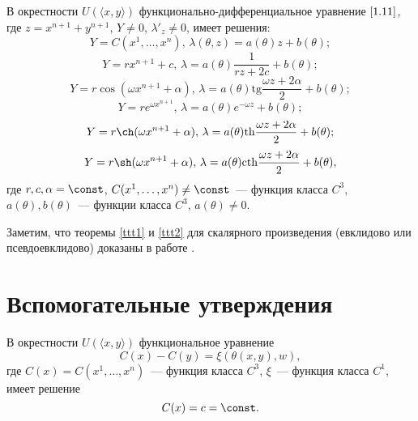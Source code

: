 \begin{thm}\label{ttt2} В окрестности $U(\langle x,y\rangle)$ функционально-дифференциальное уравнение $\eqref{1.11}$, где $z = x^{n+1} + y^{n+1}$, $Y\ne0$, $\lambda'_z\ne0$, имеет решения:
\begin{equation}\label{1.19} Y = C(x^1,\ldots,x^n),\,\lambda(\theta,z) = a(\theta)z + b(\theta); \end{equation}
\begin{equation}\label{1.20} Y = rx^{n+1} + c,\,\lambda = a(\theta)\dfrac{1}{rz+2c} + b(\theta); \end{equation}
\begin{equation}\label{1.21} Y =r\cos(\omega x^{n+1} + \alpha),\,\lambda = a(\theta)\text{tg}\dfrac{\omega z+2\alpha}{2} + b(\theta); \end{equation}
\begin{equation}\label{1.22} Y =re^{\omega x^{n+1}},\,\lambda = a(\theta)e^{-\omega z} + b(\theta); \end{equation}
\begin{equation}\label{1.23} Y =r\ch(\omega x^{n+1} + \alpha),\,\lambda = a(\theta)\text{th}\dfrac{\omega z+2\alpha}{2} + b(\theta); \end{equation}
\begin{equation}\label{1.24} Y =r\sh(\omega x^{n+1} + \alpha),\,\lambda = a(\theta)\text{cth}\dfrac{\omega z+2\alpha}{2} + b(\theta), \end{equation}
где $r,c,\alpha = \const$, $C(x^1,\ldots,x^n)\ne\const$~--- функция класса $C^3$, $a(\theta), b(\theta)$~--- функции класса $C^3$, $a(\theta)\ne0$. \end{thm}

Заметим, что теоремы \ref{ttt1} и \ref{ttt2} для скалярного произведения (евклидово или псевдоевклидово) доказаны в работе \cite{kyrov4}.


\section{Вспомогательные утверждения}
\begin{lem}\label{lll1} В окрестности $U(\langle x,y\rangle)$ функциональное уравнение
\begin{equation}\label{2.1} C(x) - C(y) = \xi(\theta(x,y),w), \end{equation} где $C(x)= C(x^1,\ldots,x^n)$~--- функция класса $C^3$, $\xi$~--- функция класса $C^1$, имеет решение \begin{equation}\label{2.2} C(x) = c = \const. \end{equation} \end{lem}


